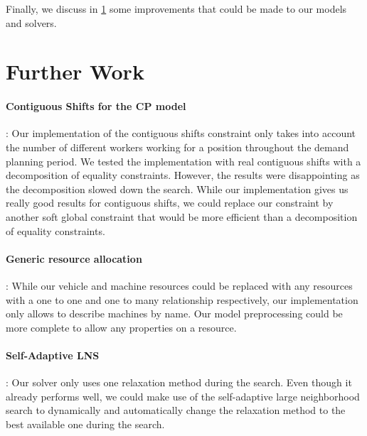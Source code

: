 \documentclass[../thesis.tex]{subfiles}
\begin{document}
Finally, we discuss in \ref{further-work} some improvements that could be made to our models and solvers.

\section{Further Work}
\label{further-work}

\paragraph{Contiguous Shifts for the CP model}: Our implementation of the contiguous shifts constraint only takes into account 
the number of different workers working for a position throughout the demand planning period.
We tested the implementation with real contiguous shifts with a decomposition of equality constraints. However, the results 
were disappointing as the decomposition slowed down the search. While our implementation gives us really good results for contiguous shifts,
we could replace our constraint by another soft global constraint that would be more efficient than 
a decomposition of equality constraints.

\paragraph{Generic resource allocation}: While our vehicle and machine resources could be replaced with 
any resources with a one to one and one to many relationship respectively, our implementation only allows to describe
machines by name. Our model preprocessing could be more complete to allow any properties on a resource.

\paragraph{Self-Adaptive LNS}: Our solver only uses one relaxation method during the search. 
Even though it already performs well, we could make 
use of the self-adaptive large neighborhood search \cite{thomas:adaptive} to dynamically 
and automatically change the relaxation method to the best available one during the search.
\end{document}
